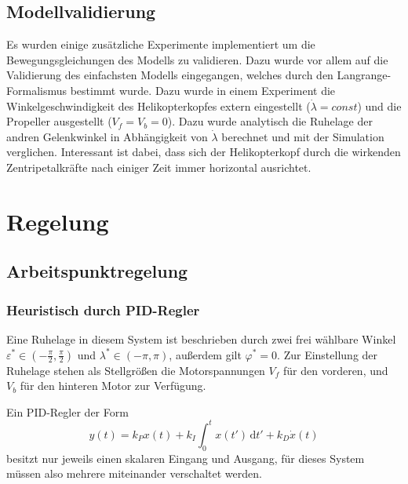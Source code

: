 \documentclass[times, 9pt,twocolumn]{article}
\begin{document}
	\subsection{Modellvalidierung}

	Es wurden einige zusätzliche Experimente implementiert um die Bewegungsgleichungen des Modells zu validieren. Dazu wurde vor allem auf die Validierung des einfachsten Modells eingegangen, welches durch den Langrange-Formalismus bestimmt wurde. Dazu wurde in einem Experiment die Winkelgeschwindigkeit des Helikopterkopfes extern eingestellt ($\dot{\lambda} = const$) und die Propeller ausgestellt ($V_f = V_b = 0$). Dazu wurde analytisch die Ruhelage der andren Gelenkwinkel in Abhängigkeit von $\dot{\lambda}$ berechnet und mit der Simulation verglichen. Interessant ist dabei, dass sich der Helikopterkopf durch die wirkenden Zentripetalkräfte nach einiger Zeit immer horizontal ausrichtet.
	\clearpage
	\section{Regelung}
	\subsection{Arbeitspunktregelung}
	\subsubsection{Heuristisch durch PID-Regler}
	Eine Ruhelage in diesem System ist beschrieben durch zwei frei wählbare Winkel \(\varepsilon^* \in (-\frac{\pi}{2}, \frac{\pi}{2})\) und \(\lambda^* \in (-\pi, \pi)\), außerdem gilt \(\varphi^*=0\).
	Zur Einstellung der Ruhelage stehen als Stellgrößen die Motorspannungen \(V_f\) für den vorderen, und \(V_b\) für den hinteren Motor zur Verfügung.

	Ein PID-Regler der Form
	\[
		y(t) = k_P x(t) + k_I \int_0^t x(t') \, \mathrm{d}t' +  k_D \dot{x}(t)
	\]
	besitzt nur jeweils einen skalaren Eingang und Ausgang, für dieses System müssen also mehrere miteinander verschaltet werden.
	
\end{document}
